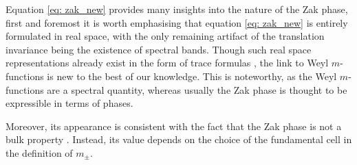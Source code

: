 \documentclass[a4paper,reqno,twoside]{amsart}
\numberwithin{equation}{section}
\theoremstyle{definition}
\newcommand{\<}{\ensuremath \leq}
\renewcommand{\>}{\ensuremath \geq}
\begin{document}
Equation \eqref{eq: zak_new} provides many insights into the nature of the Zak phase, first and foremost it is worth emphasising that equation \eqref{eq: zak_new} is entirely formulated in real space, with the only remaining artifact of the translation invariance being the existence of spectral bands. Though such real space representations already exist in the form of trace formulas \cite{onaya2025formally, Jezequel2022-pv, resta1994macroscopic}, the link to Weyl $m$-functions is new to the best of our knowledge. This is noteworthy, as the Weyl $m$-functions are a spectral quantity, whereas usually the Zak phase is thought to be expressible  in terms of phases.

Moreover, its appearance is consistent with the fact that the Zak phase is not a bulk property \cite{Heeger1988,PhysRevB.89.161117,Atala2013, intercellular,resta1994macroscopic}. Instead, its value depends on the choice of the fundamental cell in the definition of $m_\pm$.

\end{document}
